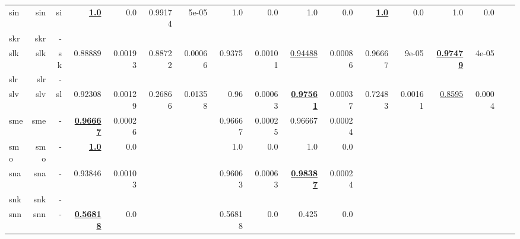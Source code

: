 \documentclass[11pt]{article}
\begin{document}
\begin{table*}[h]
{\begin{tabular}{lrrrrrrrrrrrrrrrr}
sin         & sin         & si         & \textbf{\underline{1.0}}         & 0.0         & 0.99174         & 5e-05         & 1.0         & 0.0         & 1.0         & 0.0         & \textbf{\underline{1.0}}         & 0.0         & 1.0         & 0.0         \\
skr         & skr         & -         &          &          &          &          &          &          &          &          &          &          &          &          \\
slk         & slk         & sk         & 0.88889         & 0.00193         & 0.88722         & 0.00066         & 0.9375         & 0.00101         & \underline{0.94488}         & 0.00086         & 0.96667         & 9e-05         & \textbf{\underline{0.97479}}         & 4e-05         \\
slr         & slr         & -         &          &          &          &          &          &          &          &          &          &          &          &          \\
slv         & slv         & sl         & 0.92308         & 0.00129         & 0.26866         & 0.01358         & 0.96         & 0.00063         & \textbf{\underline{0.97561}}         & 0.00037         & 0.72483         & 0.00161         & \underline{0.8595}         & 0.0004         \\
sme         & sme         & -         & \textbf{\underline{0.96667}}         & 0.00026         &          &          & 0.96667         & 0.00025         & 0.96667         & 0.00024         &          &          &          &          \\
smo         & smo         & -         & \textbf{\underline{1.0}}         & 0.0         &          &          & 1.0         & 0.0         & 1.0         & 0.0         &          &          &          &          \\
sna         & sna         & -         & 0.93846         & 0.00103         &          &          & 0.96063         & 0.00063         & \textbf{\underline{0.98387}}         & 0.00024         &          &          &          &          \\
snk         & snk         & -         &          &          &          &          &          &          &          &          &          &          &          &          \\
snn         & snn         & -         & \textbf{\underline{0.56818}}         & 0.0         &          &          & 0.56818         & 0.0         & 0.425         & 0.0         &          &          &          &          \\

\end{tabular}}
\end{table*}
\end{document}
